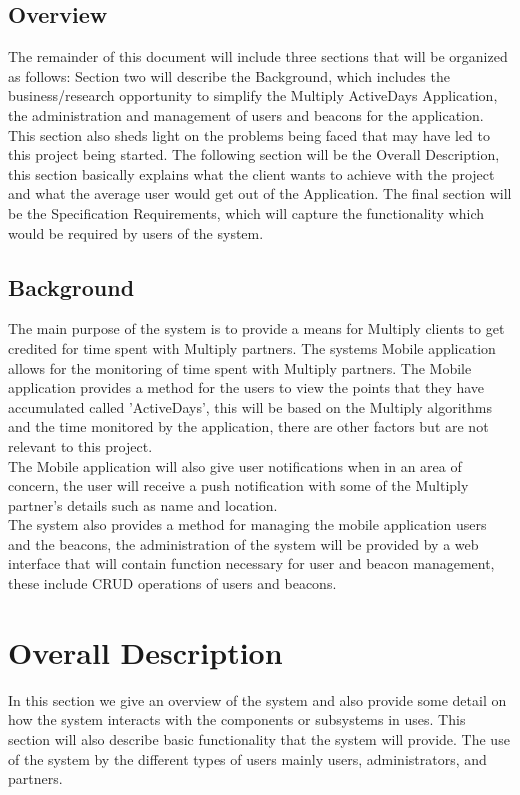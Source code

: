 \documentclass[11pt]{article}
\begin{document}
\subsection{Overview}
The remainder of this document will include three sections that will be organized as follows:
Section two will describe the Background, which includes the business/research opportunity to
simplify the Multiply ActiveDays Application, the administration and management of users and beacons for the application. This section also sheds light on the problems being faced that may have led
to this project being started. The following section will be the Overall Description, this section basically explains what the client wants to achieve with the project and what the average user would get out of the Application. The final section will be the Specification Requirements, which will capture the functionality which would be required by users of the system.
\subsection{Background}
The main purpose of the system is to provide a means for Multiply clients to get credited for time spent with Multiply partners. The systems Mobile application allows for the monitoring of time spent with Multiply partners. The Mobile application provides a method for the users to view the points that they have accumulated called 'ActiveDays', this will be based on the Multiply algorithms and the time monitored by the application, there are other factors but are not relevant to this project.\\
The Mobile application will also give user notifications when in an area of concern, the user will receive a  push notification with some of the Multiply partner's details such as name and location. \\
The system also provides a method for managing the mobile application users and the beacons, the administration of the system will be provided by a web interface that will contain function necessary for user and beacon management, these include CRUD operations of users and beacons.\\
\section{Overall Description}
In this section we give an overview of the system and also provide some detail on how the system interacts with the components or subsystems in uses. This section will also describe basic functionality that the system will provide. The use of the system by the different types of users mainly users, administrators, and partners.     
\end{document}
